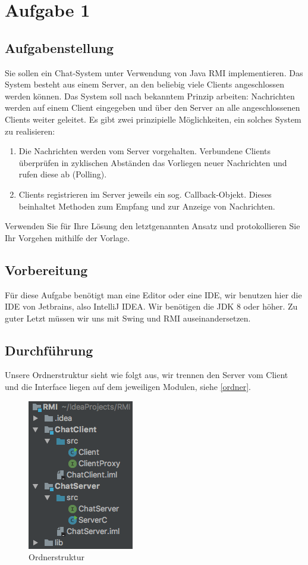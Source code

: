 \newpage

\section{Aufgabe 1}

\subsection{Aufgabenstellung}
Sie sollen ein Chat-System unter Verwendung von Java RMI implementieren. Das System besteht aus einem Server, an den beliebig viele Clients angeschlossen werden können. Das System soll nach bekanntem Prinzip arbeiten: Nachrichten werden auf einem Client eingegeben und über den Server an alle angeschlossenen Clients weiter geleitet. Es gibt zwei prinzipielle Möglichkeiten, ein solches System zu realisieren:
\begin{enumerate}[label=(\alph*)]
	\item Die Nachrichten werden vom Server vorgehalten. Verbundene Clients überprüfen in zyklischen Abständen das Vorliegen neuer Nachrichten und rufen diese ab (Polling).
	\item Clients registrieren im Server jeweils ein sog. Callback-Objekt. Dieses beinhaltet Methoden zum Empfang und zur Anzeige von Nachrichten.
\end{enumerate}
Verwenden Sie für Ihre Lösung den letztgenannten Ansatz und protokollieren Sie Ihr Vorgehen mithilfe der Vorlage.

\subsection{Vorbereitung}
Für diese Aufgabe benötigt man eine Editor oder eine IDE, wir benutzen hier die IDE von Jetbrains, also IntelliJ IDEA. Wir benötigen die JDK 8 oder höher. Zu guter Letzt müssen wir uns mit Swing und RMI auseinandersetzen.

\subsection{Durchführung}
Unsere Ordnerstruktur sieht wie folgt aus, wir trennen den Server vom Client und die Interface liegen auf dem jeweiligen Modulen, siehe \autoref{ordner}.
\begin{figure}[H]
	\centering
	\includegraphics[width=0.2 \linewidth]{images/rmi_ordner}
	\caption{Ordnerstruktur} \label{ordner}
\end{figure} 


